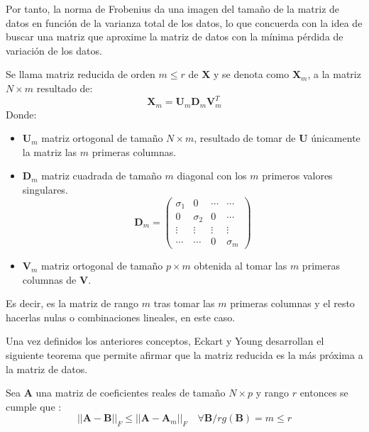 \noindent Por tanto, la norma de Frobenius da una imagen del tamaño de la matriz de datos en función de la varianza total de los datos, lo que concuerda con la idea de buscar una matriz que aproxime la matriz de datos con la mínima pérdida de variación de los datos.  

\begin{defi}
Se llama matriz reducida de orden $m\leq r$ de $\textbf{X}$ y se denota como $\textbf{X}_m$, a la matriz $N\times m $ resultado de:
\begin{equation}
\textbf{X}_m=\textbf{U}_m\mathbf{D}_m\textbf{V}^T_m
\end{equation}
Donde:
\begin{itemize}
\item $\textbf{U}_m$ matriz ortogonal de tamaño $N \times m$, resultado de tomar de \textbf{U} únicamente la matriz las $m$ primeras columnas. 
\item $\mathbf{D}_m$  matriz cuadrada de tamaño $m$ diagonal con los $m$ primeros valores singulares. 
\begin{equation}
\mathbf{D}_m=\begin{pmatrix}
\sigma_1 & 0 & \cdots  & \cdots \\
0 & \sigma_2 & 0 & \cdots\\
\vdots & \vdots & \vdots & \vdots\\
\cdots & \cdots & 0 & \sigma_m
\end{pmatrix}
\end{equation}
\item $\textbf{V}_m$ matriz ortogonal de tamaño $p \times m$ obtenida al tomar las $m$ primeras columnas de \textbf{V}.
\end{itemize}
Es decir, es la matriz de rango $m$ tras tomar las  $m$ primeras columnas y el resto hacerlas nulas o combinaciones lineales, en este caso.
\end{defi}

\noindent Una vez definidos los anteriores conceptos, Eckart y Young desarrollan el siguiente teorema que permite afirmar que la matriz reducida es la más próxima a la matriz de datos\cite{Eckart 1936, Golub 1987}.

\begin{teorema}
Sea \textbf{A} una matriz de coeficientes reales de tamaño $N\times p$ y rango $r$  entonces se cumple que :
\begin{equation}
||\textbf{A}-\textbf{B}||_F\leq ||\textbf{A}-\textbf{A}_m||_F \quad \forall \textbf{B}/ rg(\textbf{B})=m \leq r
\end{equation} 
\end{teorema}

